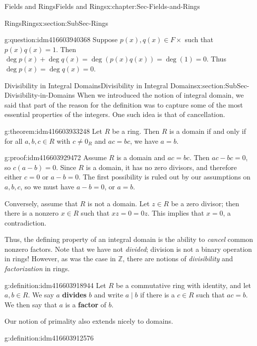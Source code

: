 \documentclass[oneside,10pt,]{book}
\newcommand{\terminology}[1]{\textbf{#1}}
\numberwithin{equation}{section}
\def\Z{{\mathbb Z}}
\begin{document}
\begin{chapterptx}{Fields and Rings}{}{Fields and Rings}{}{}{x:chapter:Sec-Fields-and-Rings}
\begin{sectionptx}{Rings}{}{Rings}{}{}{x:section:SubSec-Rings}
\begin{question}{}{g:question:idm416603940368}
Suppose \(p(x),q(x)\in F\times\) such that \(p(x) q(x) = 1\). Then \(\deg p(x) + \deg q(x) = \deg(p(x) q(x)) = \deg(1) = 0\). Thus \(\deg p(x) = \deg q(x) = 0\).%
\end{question}
\end{sectionptx}
%
%
\typeout{************************************************}
\typeout{************************************************}
%
\begin{sectionptx}{Divisibility in Integral Domains}{}{Divisibility in Integral Domains}{}{}{x:section:SubSec-Divisibility-in-Domains}
When we introduced the notion of integral domain, we said that part of the reason for the definition was to capture some of the most essential properties of the integers. One such idea is that of cancellation.%
\begin{theorem}{}{}{g:theorem:idm416603933248}%
Let \(R\) be a ring. Then \(R\) is a domain if and only if for all \(a,b,c\in R\) with \(c\ne 0_R\) and \(ac = bc\), we have \(a = b\).%
\end{theorem}
\begin{proofptx}{}{g:proof:idm416603929472}
Assume \(R\) is a domain and \(ac = bc\). Then \(ac - bc = 0\), so \(c(a-b) = 0\). Since \(R\) is a domain, it has no zero divisors, and therefore either \(c = 0\) or \(a-b=0\). The first possibility is ruled out by our assumptions on \(a,b,c\), so we must have \(a-b = 0\), or \(a =b\).%
\par
Conversely, assume that \(R\) is not a domain. Let \(z\in R\) be a zero divisor; then there is a nonzero \(x\in R\) such that \(xz = 0 = 0 z\). This implies that \(x = 0\), a contradiction.%
\end{proofptx}
Thus, the defining property of an integral domain is the ability to \emph{cancel} common nonzero factors. Note that we have not \emph{divided}; division is not a binary operation in rings! However, as was the case in \(\Z\), there are notions of \emph{divisibility} and \emph{factorization} in rings.%
\begin{definition}{}{g:definition:idm416603918944}%
Let \(R\) be a commutative ring with identity, and let \(a,b\in R\). We say \(a\) \terminology{divides} \(b\) and write \(a\mid b\) if there is a \(c\in R\) such that \(ac = b\). We then say that \(a\) is a \terminology{factor} of \(b\).%
\end{definition}
Our notion of primality also extends nicely to domains.%
\begin{definition}{}{g:definition:idm416603912576}%

\end{definition}
\end{sectionptx}
\end{chapterptx}
\end{document}
